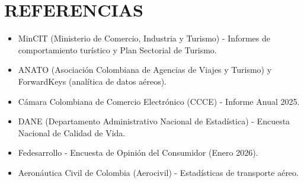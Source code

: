\documentclass[12pt,a4paper]{article}
\newcommand{\sectiontitle}[1]{\section{#1}}
\begin{document}
\sectiontitle{REFERENCIAS}

\begin{itemize}
    \item MinCIT (Ministerio de Comercio, Industria y Turismo) - Informes de comportamiento turístico y Plan Sectorial de Turismo.
    \item ANATO (Asociación Colombiana de Agencias de Viajes y Turismo) y ForwardKeys (analítica de datos aéreos).
    \item Cámara Colombiana de Comercio Electrónico (CCCE) - Informe Anual 2025.
    \item DANE (Departamento Administrativo Nacional de Estadística) - Encuesta Nacional de Calidad de Vida.
    \item Fedesarrollo - Encuesta de Opinión del Consumidor (Enero 2026).
    \item Aeronáutica Civil de Colombia (Aerocivil) - Estadísticas de transporte aéreo.
\end{itemize}
\end{document}
